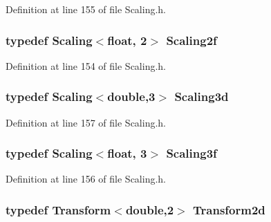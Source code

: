 Definition at line 155 of file Scaling.\-h.

\hypertarget{group___geometry___module_ga6dadc39dddd1468c0f43795bd3b3ddc9}{
\subsubsection[{Scaling2f}]{\setlength{\rightskip}{0pt plus 5cm}typedef {\bf Scaling}$<${\bf float}, 2$>$ {\bf Scaling2f}}}\label{group___geometry___module_ga6dadc39dddd1468c0f43795bd3b3ddc9}


Definition at line 154 of file Scaling.\-h.

\hypertarget{group___geometry___module_gaf3a886c00ace0d612f1c08d1a2ccc5a7}{
\subsubsection[{Scaling3d}]{\setlength{\rightskip}{0pt plus 5cm}typedef {\bf Scaling}$<${\bf double},3$>$ {\bf Scaling3d}}}\label{group___geometry___module_gaf3a886c00ace0d612f1c08d1a2ccc5a7}


Definition at line 157 of file Scaling.\-h.

\hypertarget{group___geometry___module_ga371d61f9b9e65a0c9226df2f84e2b889}{
\subsubsection[{Scaling3f}]{\setlength{\rightskip}{0pt plus 5cm}typedef {\bf Scaling}$<${\bf float}, 3$>$ {\bf Scaling3f}}}\label{group___geometry___module_ga371d61f9b9e65a0c9226df2f84e2b889}


Definition at line 156 of file Scaling.\-h.

\hypertarget{group___geometry___module_ga50b7384fd223c0bbe68f07f45770e155}{
\subsubsection[{Transform2d}]{\setlength{\rightskip}{0pt plus 5cm}typedef {\bf Transform}$<${\bf double},2$>$ {\bf Transform2d}}}\label{group___geometry___module_ga50b7384fd223c0bbe68f07f45770e155}


